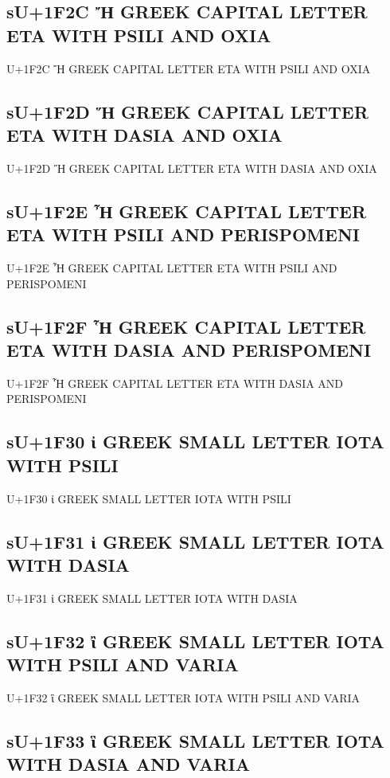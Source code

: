 \subsection{sU+1F2C Ἤ GREEK CAPITAL LETTER ETA WITH PSILI AND OXIA}

U+1F2C Ἤ GREEK CAPITAL LETTER ETA WITH PSILI AND OXIA

\subsection{sU+1F2D Ἥ GREEK CAPITAL LETTER ETA WITH DASIA AND OXIA}

U+1F2D Ἥ GREEK CAPITAL LETTER ETA WITH DASIA AND OXIA

\subsection{sU+1F2E Ἦ GREEK CAPITAL LETTER ETA WITH PSILI AND PERISPOMENI}

U+1F2E Ἦ GREEK CAPITAL LETTER ETA WITH PSILI AND PERISPOMENI

\subsection{sU+1F2F Ἧ GREEK CAPITAL LETTER ETA WITH DASIA AND PERISPOMENI}

U+1F2F Ἧ GREEK CAPITAL LETTER ETA WITH DASIA AND PERISPOMENI

\subsection{sU+1F30 ἰ GREEK SMALL LETTER IOTA WITH PSILI}

U+1F30 ἰ GREEK SMALL LETTER IOTA WITH PSILI

\subsection{sU+1F31 ἱ GREEK SMALL LETTER IOTA WITH DASIA}

U+1F31 ἱ GREEK SMALL LETTER IOTA WITH DASIA

\subsection{sU+1F32 ἲ GREEK SMALL LETTER IOTA WITH PSILI AND VARIA}

U+1F32 ἲ GREEK SMALL LETTER IOTA WITH PSILI AND VARIA

\subsection{sU+1F33 ἳ GREEK SMALL LETTER IOTA WITH DASIA AND VARIA}

